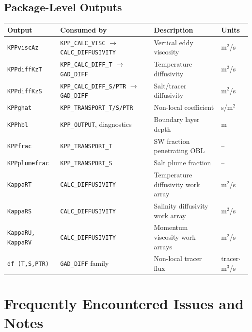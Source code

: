 \documentclass[12pt,letterpaper]{article}
\begin{document}
\subsection{Package-Level Outputs}  
  
\begin{longtable}{p{3.5cm} p{3cm} p{4.5cm} l}  
\toprule  
\textbf{Output} & \textbf{Consumed by} & \textbf{Description} & \textbf{Units} \\  
\midrule  
\endhead  
\texttt{KPPviscAz} & \texttt{KPP\_CALC\_VISC} $\to$ \texttt{CALC\_DIFFUSIVITY} &  
  Vertical eddy viscosity & m$^2$/s \\  
\texttt{KPPdiffKzT} & \texttt{KPP\_CALC\_DIFF\_T} $\to$ \texttt{GAD\_DIFF} &  
  Temperature diffusivity & m$^2$/s \\  
\texttt{KPPdiffKzS} & \texttt{KPP\_CALC\_DIFF\_S/PTR} $\to$ \texttt{GAD\_DIFF} &  
  Salt/tracer diffusivity & m$^2$/s \\  
\texttt{KPPghat} & \texttt{KPP\_TRANSPORT\_T/S/PTR} &  
  Non-local coefficient & s/m$^2$ \\  
\texttt{KPPhbl} & \texttt{KPP\_OUTPUT}, diagnostics &  
  Boundary layer depth & m \\  
\texttt{KPPfrac} & \texttt{KPP\_TRANSPORT\_T} &  
  SW fraction penetrating OBL & -- \\  
\texttt{KPPplumefrac} & \texttt{KPP\_TRANSPORT\_S} &  
  Salt plume fraction & -- \\  
\texttt{KappaRT} & \texttt{CALC\_DIFFUSIVITY} &  
  Temperature diffusivity work array & m$^2$/s \\  
\texttt{KappaRS} & \texttt{CALC\_DIFFUSIVITY} &  
  Salinity diffusivity work array & m$^2$/s \\  
\texttt{KappaRU, KappaRV} & \texttt{CALC\_DIFFUSIVITY} &  
  Momentum viscosity work arrays & m$^2$/s \\  
\texttt{df (T,S,PTR)} & \texttt{GAD\_DIFF} family &  
  Non-local tracer flux & tracer$\cdot$m$^3$/s \\  
\bottomrule  
\end{longtable}  
  
\section{Frequently Encountered Issues and Notes}  
  
\end{document}
